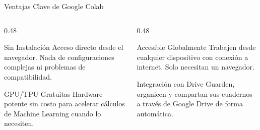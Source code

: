 \documentclass[aspectratio=169]{beamer}
\begin{document}
\begin{frame}{Ventajas Clave de Google Colab}
  \begin{columns}[T]
    \begin{column}{0.48\textwidth}
      \begin{conceptbox}{\faLaptop\enspace Sin Instalación}
        \small
        Acceso directo desde el navegador. Nada de configuraciones
        complejas ni problemas de compatibilidad.
      \end{conceptbox}
      \vspace{0.15cm}
      \begin{conceptbox}{\faMicrochip\enspace GPU/TPU Gratuitas}
        \small
        Hardware potente sin costo para acelerar cálculos de
        Machine Learning cuando lo necesiten.
      \end{conceptbox}
    \end{column}
    \begin{column}{0.48\textwidth}
      \begin{conceptbox}{\faGlobe\enspace Accesible Globalmente}
        \small
        Trabajen desde cualquier dispositivo con conexión a internet.
        Solo necesitan un navegador.
      \end{conceptbox}
      \vspace{0.15cm}
      \begin{conceptbox}{\faGoogleDrive\enspace Integración con Drive}
        \small
        Guarden, organicen y compartan sus cuadernos a través de
        Google Drive de forma automática.
      \end{conceptbox}
    \end{column}
  \end{columns}
\end{frame}
\end{document}
